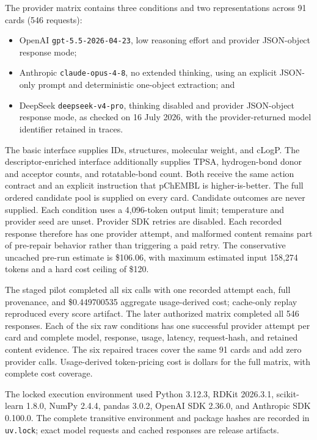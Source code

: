 \documentclass[10pt,a4paper]{article}
\begin{document}
The provider matrix contains three conditions and two representations across 91
cards (546 requests):

\begin{itemize}
  \item OpenAI \texttt{gpt-5.5-2026-04-23}, low reasoning effort and provider
  JSON-object response mode;
  \item Anthropic \texttt{claude-opus-4-8}, no extended thinking, using an
  explicit JSON-only prompt and deterministic one-object extraction; and
  \item DeepSeek \texttt{deepseek-v4-pro}, thinking disabled and provider
  JSON-object response mode, as checked on 16 July 2026, with the
  provider-returned model identifier retained in traces.
\end{itemize}

The basic interface supplies IDs, structures, molecular weight, and cLogP. The
descriptor-enriched interface additionally supplies TPSA, hydrogen-bond donor
and acceptor counts, and rotatable-bond count. Both receive the same action
contract and an explicit instruction that pChEMBL is higher-is-better. The
full ordered candidate pool is supplied on every card. Candidate outcomes are
never supplied. Each condition uses a 4,096-token output limit; temperature and
provider seed are unset. Provider SDK retries are disabled. Each recorded
response therefore has one provider attempt, and malformed content remains
part of pre-repair behavior rather than triggering a paid retry. The
conservative uncached pre-run estimate is \$106.06, with maximum estimated
input 158,274 tokens and a hard cost ceiling of \$120.

The staged pilot completed all six calls with one recorded attempt each, full
provenance, and \$0.449700535 aggregate usage-derived cost; cache-only replay
reproduced every score artifact. The later authorized matrix completed all 546
responses. Each of the six raw conditions has one successful provider attempt
per card and complete model, response, usage, latency, request-hash, and retained
content evidence. The six repaired traces cover the same 91 cards and add zero
provider calls. Usage-derived token-pricing cost is \TotalLLMCost{} dollars for
the full matrix, with complete cost coverage.

The locked execution environment used Python 3.12.3, RDKit 2026.3.1,
scikit-learn 1.8.0, NumPy 2.4.4, pandas 3.0.2, OpenAI SDK 2.36.0, and
Anthropic SDK 0.100.0. The complete transitive environment and package hashes
are recorded in \texttt{uv.lock}; exact model requests and cached responses are
release artifacts.
\end{document}
